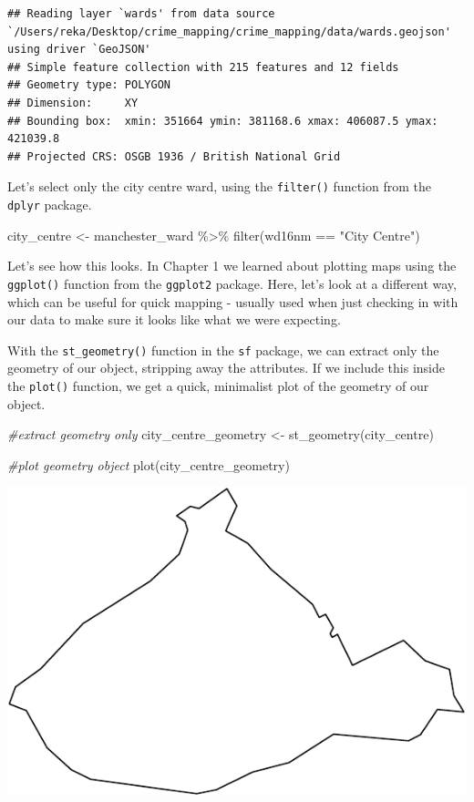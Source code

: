 \documentclass[
]{book}
\newenvironment{Shaded}{\begin{snugshade}}{\end{snugshade}}
\newcommand{\CommentTok}[1]{\textcolor[rgb]{0.56,0.35,0.01}{\textit{#1}}}
\newcommand{\FunctionTok}[1]{\textcolor[rgb]{0.00,0.00,0.00}{#1}}
\newcommand{\NormalTok}[1]{#1}
\newcommand{\OtherTok}[1]{\textcolor[rgb]{0.56,0.35,0.01}{#1}}
\newcommand{\SpecialCharTok}[1]{\textcolor[rgb]{0.00,0.00,0.00}{#1}}
\newcommand{\StringTok}[1]{\textcolor[rgb]{0.31,0.60,0.02}{#1}}
\begin{document}
\begin{verbatim}
## Reading layer `wards' from data source `/Users/reka/Desktop/crime_mapping/crime_mapping/data/wards.geojson' using driver `GeoJSON'
## Simple feature collection with 215 features and 12 fields
## Geometry type: POLYGON
## Dimension:     XY
## Bounding box:  xmin: 351664 ymin: 381168.6 xmax: 406087.5 ymax: 421039.8
## Projected CRS: OSGB 1936 / British National Grid
\end{verbatim}

Let's select only the city centre ward, using the \texttt{filter()} function from the \texttt{dplyr} package.

\begin{Shaded}
\begin{Highlighting}[]
\NormalTok{city\_centre }\OtherTok{\textless{}{-}}\NormalTok{ manchester\_ward }\SpecialCharTok{\%\textgreater{}\%}
  \FunctionTok{filter}\NormalTok{(wd16nm }\SpecialCharTok{==} \StringTok{"City Centre"}\NormalTok{)}
\end{Highlighting}
\end{Shaded}

Let's see how this looks. In Chapter 1 we learned about plotting maps using the \texttt{ggplot()} function from the \texttt{ggplot2} package. Here, let's look at a different way, which can be useful for quick mapping - usually used when just checking in with our data to make sure it looks like what we were expecting.

With the \texttt{st\_geometry()} function in the \texttt{sf} package, we can extract only the geometry of our object, stripping away the attributes. If we include this inside the \texttt{plot()} function, we get a quick, minimalist plot of the geometry of our object.

\begin{Shaded}
\begin{Highlighting}[]
\CommentTok{\#extract geometry only}
\NormalTok{city\_centre\_geometry }\OtherTok{\textless{}{-}} \FunctionTok{st\_geometry}\NormalTok{(city\_centre)}

\CommentTok{\#plot geometry object}
\FunctionTok{plot}\NormalTok{(city\_centre\_geometry)}
\end{Highlighting}
\end{Shaded}

\includegraphics{crime_mapping_files/figure-latex/plot_2b-1.pdf}
\end{document}
